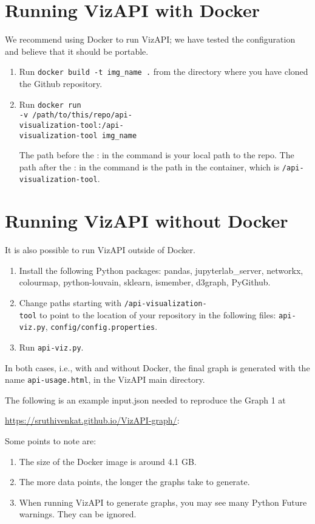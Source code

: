 \section{Running VizAPI with Docker}
We recommend using Docker to run VizAPI; we have tested the configuration and believe that it should be portable.
\begin{enumerate}
\item Run \texttt{docker build -t img\_name .} 
from the directory where you have cloned the Github repository.
\item Run \texttt{docker run \\\hspace*{1em} -v /path/to/this/repo/api-\\\hspace*{1em} visualization-tool:/api-\\ \hspace*{1em} visualization-tool img\_name} 

The path before the : in the command is your local path to the repo. The path after the : in the command is the path in the container, which is \texttt{/api-visualization-tool}.
\end{enumerate}

\section{Running VizAPI without Docker}
It is also possible to run VizAPI outside of Docker.
\begin{enumerate}
\item Install the following Python packages: pandas, jupyterlab\_server, networkx, colourmap, python-louvain, sklearn, ismember, d3graph, PyGithub.
\item Change paths starting with \texttt{/api-visualization-\\tool} to point to the location of your repository in the following files: \texttt{api-viz.py}, \texttt{config/config.properties}.
\item Run \texttt{api-viz.py}.
\end{enumerate}

In both cases, i.e., with and without Docker, the final graph is generated with the name \texttt{api-usage.html}, in the VizAPI 
main directory.

The following is an example input.json needed to reproduce the Graph 1 at 

\href{https://sruthivenkat.github.io/VizAPI-graph/}{https://sruthivenkat.github.io/VizAPI-graph/}:


Some points to note are:
\begin{enumerate}
\item The size of the Docker image is around 4.1 GB.
\item The more data points, the longer the graphs take to generate.
\item When running VizAPI to generate graphs, you may see many Python Future warnings. They can be ignored.
\end{enumerate}